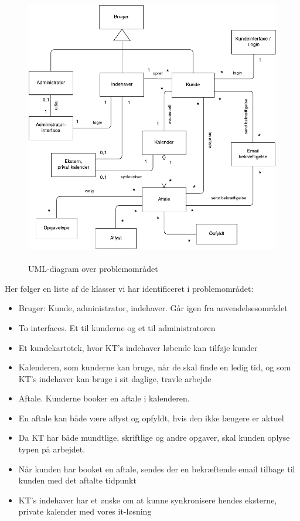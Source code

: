 \documentclass[12pt]{article}   %
\begin{document}
\begin{figure}[!ht]
\includegraphics[width=12cm, height=12cm]{problemomr.pdf}
\caption{UML-diagram over problemområdet}
\label{fig:problem}
\end{figure}

Her følger en liste af de klasser vi har identificeret i problemområdet:

\begin{itemize}
\item Bruger: Kunde, administrator, indehaver. Går igen fra
	anvendelsesområdet
\item To interfaces. Et til kunderne og et til administratoren
\item Et kundekartotek, hvor KT's indehaver løbende kan tilføje kunder
\item Kalenderen, som kunderne kan bruge, når de skal finde en ledig tid, og
	som KT's indehaver kan bruge i sit daglige, travle arbejde
\item Aftale. Kunderne booker en aftale i kalenderen.
\item En aftale kan både være aflyst og opfyldt, hvis den ikke længere er
	aktuel
\item Da KT har både mundtlige, skriftlige og andre opgaver, skal kunden
	oplyse typen på arbejdet.
\item Når kunden har booket en aftale, sendes der en bekræftende email tilbage
	til kunden med det aftalte tidpunkt
\item KT's indehaver har et ønske om at kunne synkronisere hendes eksterne,
	private kalender med vores it-løsning
\end{itemize}
\end{document}
